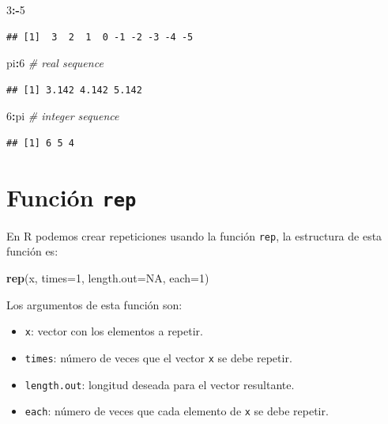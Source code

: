 \documentclass[10pt,]{krantz}
\makeatletter
\newenvironment{Shaded}{\begin{snugshade}}{\end{snugshade}}
\newcommand{\KeywordTok}[1]{\textcolor[rgb]{0.13,0.29,0.53}{\textbf{#1}}}
\newcommand{\DataTypeTok}[1]{\textcolor[rgb]{0.13,0.29,0.53}{#1}}
\newcommand{\DecValTok}[1]{\textcolor[rgb]{0.00,0.00,0.81}{#1}}
\newcommand{\CommentTok}[1]{\textcolor[rgb]{0.56,0.35,0.01}{\textit{#1}}}
\newcommand{\OtherTok}[1]{\textcolor[rgb]{0.56,0.35,0.01}{#1}}
\newcommand{\OperatorTok}[1]{\textcolor[rgb]{0.81,0.36,0.00}{\textbf{#1}}}
\newcommand{\NormalTok}[1]{#1}
\providecommand{\tightlist}{%
  \setlength{\itemsep}{0pt}\setlength{\parskip}{0pt}}
\newenvironment{kframe}{%
\medskip{}
\setlength{\fboxsep}{.8em}
 \def\at@end@of@kframe{}%
 \ifinner\ifhmode%
  \def\at@end@of@kframe{\end{minipage}}%
  \begin{minipage}{\columnwidth}%
 \fi\fi%
 \def\FrameCommand##1{\hskip\@totalleftmargin \hskip-\fboxsep
 \colorbox{shadecolor}{##1}\hskip-\fboxsep
     \hskip-\linewidth \hskip-\@totalleftmargin \hskip\columnwidth}%
 \MakeFramed {\advance\hsize-\width
   \@totalleftmargin\z@ \linewidth\hsize
   \@setminipage}}%
 {\par\unskip\endMakeFramed%
 \at@end@of@kframe}
\renewenvironment{Shaded}{\begin{kframe}}{\end{kframe}}
\makeatother
\begin{document}
\begin{Shaded}
\begin{Highlighting}[]
\DecValTok{3}\OperatorTok{:-}\DecValTok{5}
\end{Highlighting}
\end{Shaded}

\begin{verbatim}
## [1]  3  2  1  0 -1 -2 -3 -4 -5
\end{verbatim}

\begin{Shaded}
\begin{Highlighting}[]
\NormalTok{pi}\OperatorTok{:}\DecValTok{6}  \CommentTok{# real sequence}
\end{Highlighting}
\end{Shaded}

\begin{verbatim}
## [1] 3.142 4.142 5.142
\end{verbatim}

\begin{Shaded}
\begin{Highlighting}[]
\DecValTok{6}\OperatorTok{:}\NormalTok{pi  }\CommentTok{# integer sequence}
\end{Highlighting}
\end{Shaded}

\begin{verbatim}
## [1] 6 5 4
\end{verbatim}

\section{\texorpdfstring{Función \texttt{rep} 
}{Función rep  }}\label{funcion-rep}

En R podemos crear repeticiones usando la función \texttt{rep}, la
estructura de esta función es:

\begin{Shaded}
\begin{Highlighting}[]
\KeywordTok{rep}\NormalTok{(x, }\DataTypeTok{times=}\DecValTok{1}\NormalTok{, }\DataTypeTok{length.out=}\OtherTok{NA}\NormalTok{, }\DataTypeTok{each=}\DecValTok{1}\NormalTok{)}
\end{Highlighting}
\end{Shaded}

Los argumentos de esta función son:

\begin{itemize}
\tightlist
\item
  \texttt{x}: vector con los elementos a repetir.
\item
  \texttt{times}: número de veces que el vector \texttt{x} se debe
  repetir.
\item
  \texttt{length.out}: longitud deseada para el vector resultante.
\item
  \texttt{each}: número de veces que cada elemento de \texttt{x} se debe
  repetir.
\end{itemize}
\end{document}
